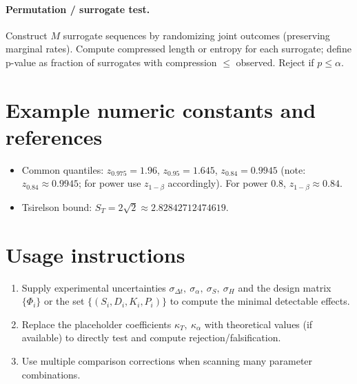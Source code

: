 \documentclass{article}
\begin{document}
\paragraph{Permutation / surrogate test.}
Construct $M$ surrogate sequences by randomizing joint outcomes (preserving marginal rates). Compute compressed length or entropy for each surrogate; define p-value as fraction of surrogates with compression $\le$ observed. Reject if $p\le\alpha$.

\section{Example numeric constants and references}
\begin{itemize}
\item Common quantiles: $z_{0.975}=1.96$, $z_{0.95}=1.645$, $z_{0.84}=0.9945$ (note: $z_{0.84}\approx 0.9945$; for power use $z_{1-\beta}$ accordingly). For power $0.8$, $z_{1-\beta}\approx 0.84$.
\item Tsirelson bound: $S_T=2\sqrt{2}\approx 2.82842712474619$.
\end{itemize}

\section*{Usage instructions}
\begin{enumerate}
\item Supply experimental uncertainties $\sigma_{\Delta t},\ \sigma_\alpha,\ \sigma_S,\ \sigma_H$ and the design matrix $\{\Phi_i\}$ or the set $\{(S_i,D_i,K_i,P_i)\}$ to compute the minimal detectable effects.
\item Replace the placeholder coefficients $\kappa_T,\ \kappa_\alpha$ with theoretical values (if available) to directly test and compute rejection/falsification.
\item Use multiple comparison corrections when scanning many parameter combinations.
\end{enumerate}
\end{document}
